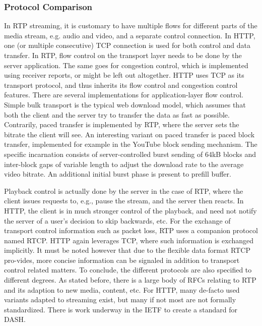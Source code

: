 \subsubsection{Protocol Comparison}
In \gls{RTP} streaming, it is customary to have multiple flows for different parts of the media stream, e.g. audio and video, and a separate control connection. In \gls{HTTP}, one (or multiple consecutive) TCP connection is used for both control and data transfer.
In \gls{RTP}, flow control on the transport layer needs to be done by the server application. The same goes for congestion control, which is implemented using receiver reports, or might be left out altogether. HTTP uses TCP as its transport protocol, and thus inherits its flow control and congestion control features.
There are several implementations for application-layer flow control. Simple bulk transport is the typical web download model, which assumes that both the client and the server try to transfer the data as fast as possible. Contrarily, paced transfer is implemented by \gls{RTP}, where the server sets the bitrate the client will see. An interesting variant on paced transfer is paced block transfer, implemented for example in the YouTube block sending mechanism. The specific incarnation consists of server-controlled burst sending of 64kB blocks and inter-block gaps of variable length to adjust the download rate to the average video bitrate. An additional initial burst phase is present to prefill buffer.
 
Playback control is actually done by the server in the case of RTP, where the client issues requests to, e.g., pause the stream, and the server then reacts. In HTTP, the client is in much stronger control of the playback, and need not notify the server of a user's decision to skip backwards, etc. 
For the exchange of transport control information such as packet loss, RTP uses a companion protocol named \gls{RTCP}. HTTP again leverages TCP, where such information is exchanged implicitly. It must be noted however that due to the flexible data format RTCP pro-vides, more concise information can be signaled in addition to transport control related matters.
To conclude, the different protocols are also specified to different degrees. As stated before, there is a large body of \glspl{RFC} relating to RTP and its adaption to new media, content, etc. For HTTP, many de-facto used variants adapted to streaming exist, but many if not most are not formally standardized. There is work underway in the \gls{IETF} to create a standard for \gls{DASH}.



